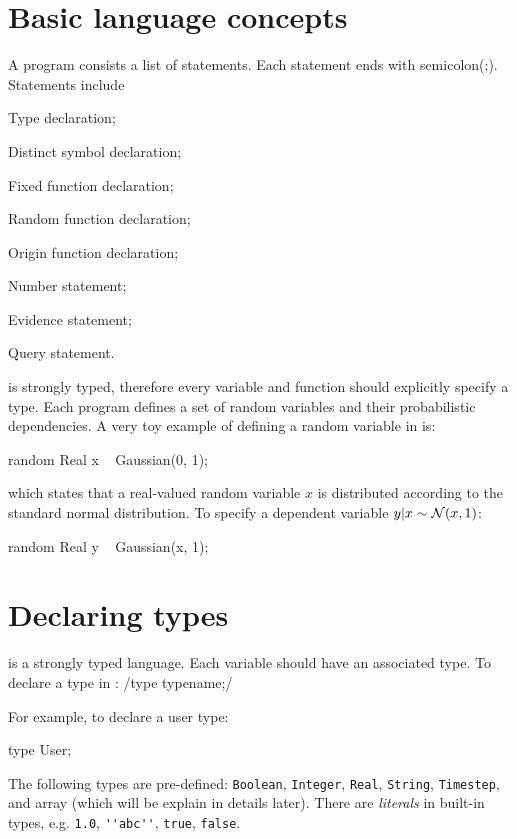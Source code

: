 \documentclass[12pt]{article}
\begin{document}
\section{Basic language concepts}
A \bl program consists a list of statements.
Each statement ends with semicolon(;). 
Statements include 
\begin{enumerate*}
\item Type declaration; 
\item Distinct symbol declaration;
\item Fixed function declaration;
\item Random function declaration;
\item Origin function declaration;
\item Number statement;
\item Evidence statement;
\item Query statement.
\end{enumerate*}

\bl is strongly typed, therefore every variable and function should explicitly specify a type.
Each \bl program defines a set of random variables and their probabilistic dependencies. 
A very toy example of defining a random variable in \bl is:

\begin{blogcode}
random Real x ~ Gaussian(0, 1);
\end{blogcode}
which states that a real-valued random variable $x$ is distributed according to the standard normal distribution. 
To specify a dependent variable $y | x \sim \mathcal{N}(x, 1)$:
\begin{blogcode}
random Real y ~ Gaussian(x, 1);
\end{blogcode}

\section{Declaring types}
\bl is a strongly typed language. Each variable should have an associated type.
 To declare a type in \bl:
\blog/type typename;/

For example, to declare a user type:
\begin{blogcode}
type User;
\end{blogcode}

The following types are pre-defined: \verb|Boolean|, \verb|Integer|, \verb|Real|, \verb|String|, \verb|Timestep|,  and array (which will be explain in details later).
There are \emph{literals} in built-in types, e.g. \verb|1.0|, \verb|''abc''|, \verb|true|, \verb|false|.
\end{document}
